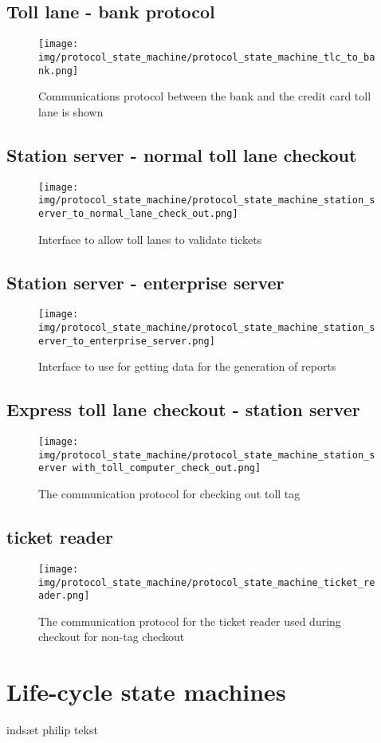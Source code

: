 \subsection*{Toll lane - bank protocol}
\begin{figure}
\centering
\texttt{[image: img/protocol\_state\_machine/protocol\_state\_machine\_tlc\_to\_bank.png]}
\caption{Communications protocol between the bank and the credit card toll lane is shown}
\label{fig:protocol_state_machine_tlc_to_bank}
\end{figure}

\subsection*{Station server - normal toll lane checkout}
\begin{figure}
\centering
\texttt{[image: img/protocol\_state\_machine/protocol\_state\_machine\_station\_server\_to\_normal\_lane\_check\_out.png]}
\caption{Interface to allow toll lanes to validate tickets}
\label{fig:protocol_state_machine_station_server_to_normal_lane_check_out}
\end{figure}

\subsection*{Station server - enterprise server}
\begin{figure}
\centering
\texttt{[image: img/protocol\_state\_machine/protocol\_state\_machine\_station\_server\_to\_enterprise\_server.png]}
\caption{Interface to use for getting data for the generation of reports}
\label{fig:protocol_state_machine_station_server_to_enterprise_server}
\end{figure}

\subsection*{Express toll lane checkout - station server}
\begin{figure}
\centering
\texttt{[image: img/protocol\_state\_machine/protocol\_state\_machine\_station\_server with\_toll\_computer\_check\_out.png]}
\caption{The communication protocol for checking out toll tag}
\label{fig:protocol_state_machine_station_server with_toll_computer_check_out}
\end{figure}

\subsection*{ticket reader}
\begin{figure}
\centering
\texttt{[image: img/protocol\_state\_machine/protocol\_state\_machine\_ticket\_reader.png]}
\caption{The communication protocol for the ticket reader used during checkout for non-tag checkout}
\label{fig:protocol_state_machine_ticket_reader}
\end{figure}


\section*{Life-cycle state machines}
indsæt philip tekst